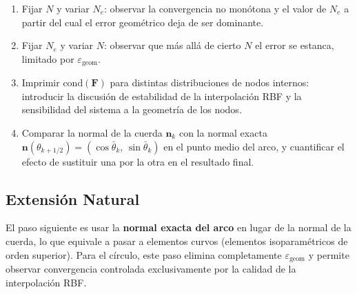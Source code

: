 \documentclass[12pt,a4paper]{article}
\begin{document}
\begin{enumerate}
    \item Fijar $N$ y variar $N_e$: observar la convergencia no monótona y
    el valor de $N_e$ a partir del cual el error geométrico deja de ser
    dominante.

    \item Fijar $N_e$ y variar $N$: observar que más allá de cierto $N$ el
    error se estanca, limitado por $\varepsilon_{\text{geom}}$.

    \item Imprimir $\mathrm{cond}(\mathbf{F})$ para distintas distribuciones
    de nodos internos: introducir la discusión de estabilidad de la
    interpolación RBF y la sensibilidad del sistema a la geometría de los
    nodos.

    \item Comparar la normal de la cuerda $\mathbf{n}_k$ con la normal
    exacta $\mathbf{n}(\theta_{k+1/2}) = (\cos\bar\theta_k,\,\sin\bar\theta_k)$
    en el punto medio del arco, y cuantificar el efecto de sustituir una
    por la otra en el resultado final.
\end{enumerate}

\subsection{Extensión Natural}

El paso siguiente es usar la \textbf{normal exacta del arco} en lugar de
la normal de la cuerda, lo que equivale a pasar a elementos curvos (elementos
isoparamétricos de orden superior). Para el círculo, este paso elimina
completamente $\varepsilon_{\text{geom}}$ y permite observar convergencia
controlada exclusivamente por la calidad de la interpolación RBF.
\end{document}
